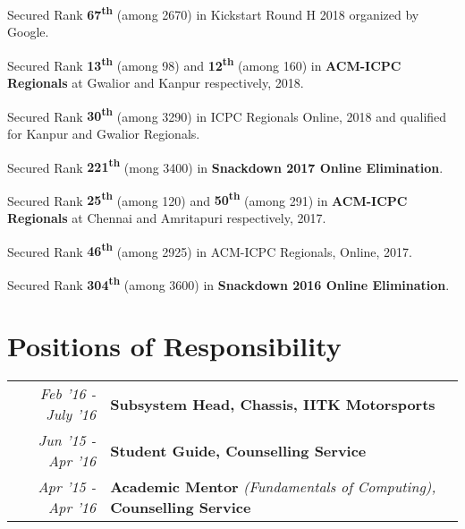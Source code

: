 \documentclass[a4paper]{norm-resume}
\begin{document}
\begin{tightitemize}
        \small
        {
        \item Secured Rank \textbf{67\textsuperscript{th}} (among 2670) in Kickstart Round H 2018 organized by Google.
        \item Secured Rank \textbf{13\textsuperscript{th}} (among 98) and \textbf{12\textsuperscript{th}} (among 160) in \textbf{ACM-ICPC Regionals} at Gwalior and Kanpur respectively, 2018.
        \item Secured Rank \textbf{30\textsuperscript{th}} (among 3290) in ICPC Regionals Online, 2018 and qualified for Kanpur and Gwalior Regionals.
        \item Secured Rank \textbf{221\textsuperscript{th}} (mong 3400) in \textbf{Snackdown 2017 Online Elimination}.
        \item Secured Rank \textbf{25\textsuperscript{th}} (among 120) and \textbf{50\textsuperscript{th}} (among 291) in \textbf{ACM-ICPC Regionals} at Chennai and Amritapuri respectively, 2017.
        \item Secured Rank \textbf{46\textsuperscript{th}} (among 2925) in ACM-ICPC Regionals, Online, 2017.
        \item Secured Rank \textbf{304\textsuperscript{th}} (among 3600) in \textbf{Snackdown 2016 Online Elimination}.
        }
\end{tightitemize}

\vspace{2mm}    %


\section{Positions of Responsibility \hrulefill}

\begin{tabular}{r|p{16cm}}
    \emph{Feb '16 - July '16} & \textbf{Subsystem Head, Chassis, IITK Motorsports}\\
    \emph{Jun '15 - Apr '16}  & \textbf{Student Guide, Counselling Service}\\
    \emph{Apr '15 - Apr '16}  & \textbf{Academic Mentor }\emph{(Fundamentals of Computing),  }\textbf{Counselling Service}\\
\end{tabular}
\end{document}
